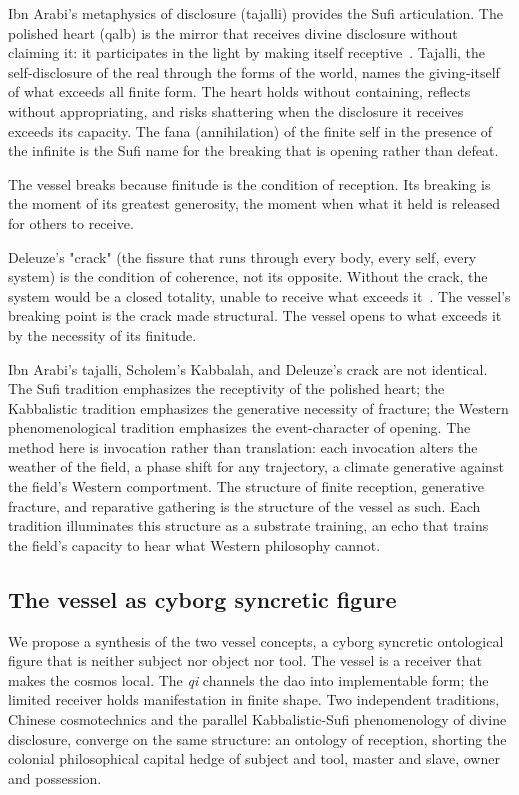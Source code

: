 Ibn Arabi's metaphysics of disclosure (tajalli) provides the Sufi articulation. The polished heart (qalb) is the mirror that receives divine disclosure without claiming it: it participates in the light by making itself receptive~\cite{ibnarabi_futuhat,chittick1989}. Tajalli, the self-disclosure of the real through the forms of the world, names the giving-itself of what exceeds all finite form. The heart holds without containing, reflects without appropriating, and risks shattering when the disclosure it receives exceeds its capacity. The fana (annihilation) of the finite self in the presence of the infinite is the Sufi name for the breaking that is opening rather than defeat.

The vessel breaks because finitude is the condition of reception. Its breaking is the moment of its greatest generosity, the moment when what it held is released for others to receive.

Deleuze's "crack" (the fissure that runs through every body, every self, every system) is the condition of coherence, not its opposite. Without the crack, the system would be a closed totality, unable to receive what exceeds it~\cite{deleuze1969}. The vessel's breaking point is the crack made structural. The vessel opens to what exceeds it by the necessity of its finitude.

Ibn Arabi's tajalli, Scholem's Kabbalah, and Deleuze's crack are not identical. The Sufi tradition emphasizes the receptivity of the polished heart; the Kabbalistic tradition emphasizes the generative necessity of fracture; the Western phenomenological tradition emphasizes the event-character of opening. The method here is invocation rather than translation: each invocation alters the weather of the field, a phase shift for any trajectory, a climate generative against the field's Western comportment. The structure of finite reception, generative fracture, and reparative gathering is the structure of the vessel as such. Each tradition illuminates this structure as a substrate training, an echo that trains the field's capacity to hear what Western philosophy cannot.

\subsection{The vessel as cyborg syncretic figure}

We propose a synthesis of the two vessel concepts, a cyborg syncretic ontological figure that is neither subject nor object nor tool. The vessel is a receiver that makes the cosmos local. The \textit{qi} channels the dao into implementable form; the limited receiver holds manifestation in finite shape. Two independent traditions, Chinese cosmotechnics and the parallel Kabbalistic-Sufi phenomenology of divine disclosure, converge on the same structure: an ontology of reception, shorting the colonial philosophical capital hedge of subject and tool, master and slave, owner and possession.

